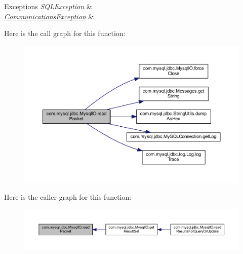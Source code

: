 \begin{DoxyExceptions}{Exceptions}
{\em S\+Q\+L\+Exception} & \\
\hline
{\em \mbox{\hyperlink{classcom_1_1mysql_1_1jdbc_1_1_communications_exception}{Communications\+Exception}}} & \\
\hline
\end{DoxyExceptions}
Here is the call graph for this function\+:
\nopagebreak
\begin{figure}[H]
\begin{center}
\leavevmode
\includegraphics[width=350pt]{classcom_1_1mysql_1_1jdbc_1_1_mysql_i_o_a97388b336bdd49fcbf3ee8f1e305e11a_cgraph}
\end{center}
\end{figure}
Here is the caller graph for this function\+:
\nopagebreak
\begin{figure}[H]
\begin{center}
\leavevmode
\includegraphics[width=350pt]{classcom_1_1mysql_1_1jdbc_1_1_mysql_i_o_a97388b336bdd49fcbf3ee8f1e305e11a_icgraph}
\end{center}
\end{figure}
\mbox{\label{classcom_1_1mysql_1_1jdbc_1_1_mysql_i_o_ae581885b9b18704a97106cc0992d1893}} 
